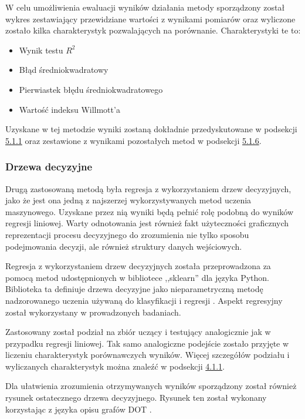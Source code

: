 \documentclass[10pt,a4paper]{article}
\begin{document}
W celu umożliwienia ewaluacji wyników działania metody sporządzony został wykres zestawiający przewidziane wartości z wynikami pomiarów oraz wyliczone zostało kilka charakterystyk pozwalających na porównanie. Charakterystyki te to:
\begin{center}
	\begin{itemize}
		\item Wynik testu $R^2$
		\item Błąd średniokwadratowy
		\item Pierwiastek błędu średniokwadratowego
		\item Wartość indeksu Willmott'a
	\end{itemize}
\end{center}

Uzyskane w tej metodzie wyniki zostaną dokładnie przedyskutowane w podsekcji \hyperlink{subsubsection.5.1.1}{5.1.1} oraz zestawione z wynikami pozostałych metod w podsekcji \hyperlink{subsubsection.5.1.6}{5.1.6}.

\subsubsection{Drzewa decyzyjne}
Drugą zastosowaną metodą była regresja z wykorzystaniem drzew decyzyjnych, jako że jest ona jedną z najszerzej wykorzystywanych metod uczenia maszynowego. Uzyskane przez nią wyniki będą pełnić rolę podobną do wyników regresji liniowej. Warty odnotowania jest również fakt użyteczności graficznych reprezentacji procesu decyzyjnego do zrozumienia nie tylko sposobu podejmowania decyzji, ale również struktury danych wejściowych. 

Regresja z wykorzystaniem drzew decyzyjnych została przeprowadzona za pomocą metod udostępnionych w bibliotece ,,sklearn'' dla języka Python. Biblioteka ta definiuje drzewa decyzyjne jako nieparametryczną metodę nadzorowanego uczenia używaną do klasyfikacji i regresji \cite{sklearnDecissionTrees}. Aspekt regresyjny został wykorzystany w prowadzonych badaniach. 

Zastosowany został podział na zbiór uczący i testujący analogicznie jak w przypadku regresji liniowej. Tak samo analogiczne podejście zostało przyjęte w liczeniu charakterystyk porównawczych wyników. Więcej szczegółów podziału i wyliczanych charakterystyk można znaleźć w podsekcji \hyperlink{subsubsection.4.1.1}{4.1.1}.

Dla ułatwienia zrozumienia otrzymywanych wyników sporządzony został również rysunek ostatecznego drzewa decyzyjnego. Rysunek ten został wykonany korzystając z języka opisu grafów DOT \cite{dotLanguage}.
\end{document}
